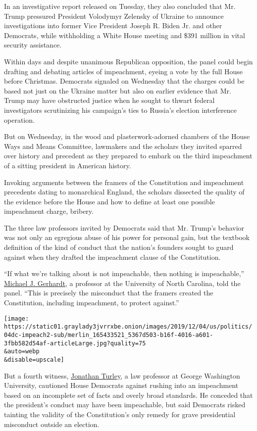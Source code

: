In an investigative report released on Tuesday, they also concluded that
Mr. Trump pressured President Volodymyr Zelensky of Ukraine to announce
investigations into former Vice President Joseph R. Biden Jr. and other
Democrats, while withholding a White House meeting and \$391 million in
vital security assistance.

Within days and despite unanimous Republican opposition, the panel could
begin drafting and debating articles of impeachment, eyeing a vote by
the full House before Christmas. Democrats signaled on Wednesday that
the charges could be based not just on the Ukraine matter but also on
earlier evidence that Mr. Trump may have obstructed justice when he
sought to thwart federal investigators scrutinizing his campaign's ties
to Russia's election interference operation.

But on Wednesday, in the wood and plasterwork-adorned chambers of the
House Ways and Means Committee, lawmakers and the scholars they invited
sparred over history and precedent as they prepared to embark on the
third impeachment of a sitting president in American history.

Invoking arguments between the framers of the Constitution and
impeachment precedents dating to monarchical England, the scholars
dissected the quality of the evidence before the House and how to define
at least one possible impeachment charge, bribery.

The three law professors invited by Democrats said that Mr. Trump's
behavior was not only an egregious abuse of his power for personal gain,
but the textbook definition of the kind of conduct that the nation's
founders sought to guard against when they drafted the impeachment
clause of the Constitution.

``If what we're talking about is not impeachable, then nothing is
impeachable,''
\href{https://www.nytimes3xbfgragh.onion/2019/12/04/us/politics/michael-gerhardt.html}{Michael
J. Gerhardt}, a professor at the University of North Carolina, told the
panel. ``This is precisely the misconduct that the framers created the
Constitution, including impeachment, to protect against.''

\texttt{[image: https://static01.graylady3jvrrxbe.onion/images/2019/12/04/us/politics/04dc-impeach2-sub/merlin\_165433521\_5367d503-b16f-4016-a601-3fbb582d54af-articleLarge.jpg?quality=75\\\&auto=webp\\\&disable=upscale]}

But a fourth witness,
\href{https://www.nytimes3xbfgragh.onion/2019/12/04/us/politics/jonathan-turley.html}{Jonathan
Turley}, a law professor at George Washington University, cautioned
House Democrats against rushing into an impeachment based on an
incomplete set of facts and overly broad standards. He conceded that the
president's conduct may have been impeachable, but said Democrats risked
tainting the validity of the Constitution's only remedy for grave
presidential misconduct outside an election.

